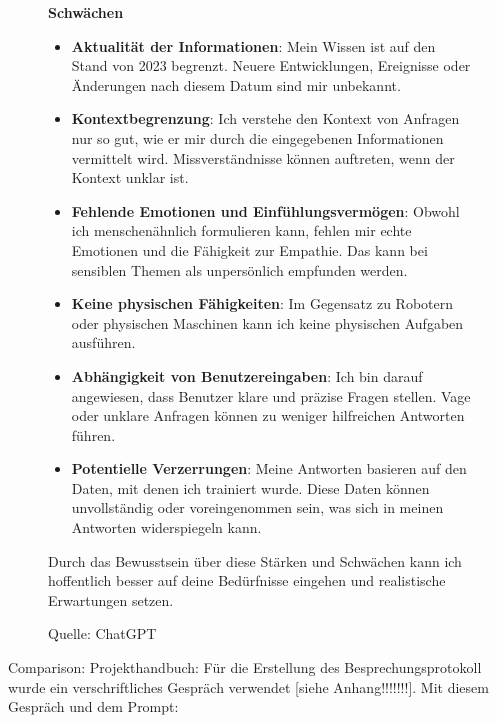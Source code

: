 \begin{figure}
\begin{tcolorbox}[colback=gray!20, colframe=gray!20, boxrule=0pt, sharp corners]
        \textbf{Schwächen}
        \begin{itemize}
            \item \textbf{Aktualität der Informationen}: Mein Wissen ist auf den Stand von 2023 begrenzt. Neuere Entwicklungen, Ereignisse oder Änderungen nach diesem Datum sind mir unbekannt.
            \item \textbf{Kontextbegrenzung}: Ich verstehe den Kontext von Anfragen nur so gut, wie er mir durch die eingegebenen Informationen vermittelt wird. Missverständnisse können auftreten, wenn der Kontext unklar ist.
            \item \textbf{Fehlende Emotionen und Einfühlungsvermögen}: Obwohl ich menschenähnlich formulieren kann, fehlen mir echte Emotionen und die Fähigkeit zur Empathie. Das kann bei sensiblen Themen als unpersönlich empfunden werden.
            \item \textbf{Keine physischen Fähigkeiten}: Im Gegensatz zu Robotern oder physischen Maschinen kann ich keine physischen Aufgaben ausführen.
            \item \textbf{Abhängigkeit von Benutzereingaben}: Ich bin darauf angewiesen, dass Benutzer klare und präzise Fragen stellen. Vage oder unklare Anfragen können zu weniger hilfreichen Antworten führen.
            \item \textbf{Potentielle Verzerrungen}: Meine Antworten basieren auf den Daten, mit denen ich trainiert wurde. Diese Daten können unvollständig oder voreingenommen sein, was sich in meinen Antworten widerspiegeln kann.
        \end{itemize}
    
        Durch das Bewusstsein über diese Stärken und Schwächen kann ich hoffentlich besser auf deine Bedürfnisse eingehen und realistische Erwartungen setzen.
        \vfill
        \end{tcolorbox}
        \caption{Quelle: ChatGPT}
        \label{StäSchwäChatGPT}
    \end{figure}

Comparison:
    Projekthandbuch:
        Für die Erstellung des Besprechungsprotokoll wurde ein verschriftliches Gespräch verwendet [siehe Anhang!!!!!!!]. Mit 
        diesem Gespräch und dem Prompt:
    

